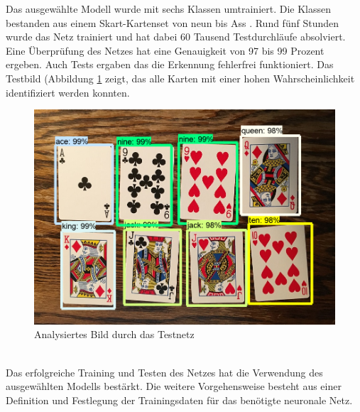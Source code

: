 \documentclass[a4paper,12pt,oneside]{article}
\begin{document}
Das ausgewählte Modell wurde mit sechs Klassen umtrainiert. Die Klassen bestanden aus einem Skart-Kartenset von neun bis Ass \cite{evan2018pic}. Rund fünf Stunden wurde das Netz trainiert und hat dabei 60 Tausend Testdurchläufe absolviert. Eine Überprüfung des Netzes hat eine Genauigkeit von 97 bis 99 Prozent ergeben. Auch Tests ergaben das die Erkennung fehlerfrei funktioniert. Das Testbild (Abbildung \ref{img:Kartenset} zeigt, das alle Karten mit einer hohen Wahrscheinlichkeit identifiziert werden konnten.
\\
\begin{figure}
    [h]
	\centering
	\includegraphics[scale=0.5]{Sources/kartenset.png}
	\caption{Analysiertes Bild durch das Testnetz}
	\label{img:Kartenset}
\end{figure}
\\
Das erfolgreiche Training und Testen des Netzes hat die Verwendung des ausgewählten Modells bestärkt. Die weitere Vorgehensweise besteht aus einer Definition und Festlegung der Trainingsdaten für das benötigte neuronale Netz. 

  
\end{document}
